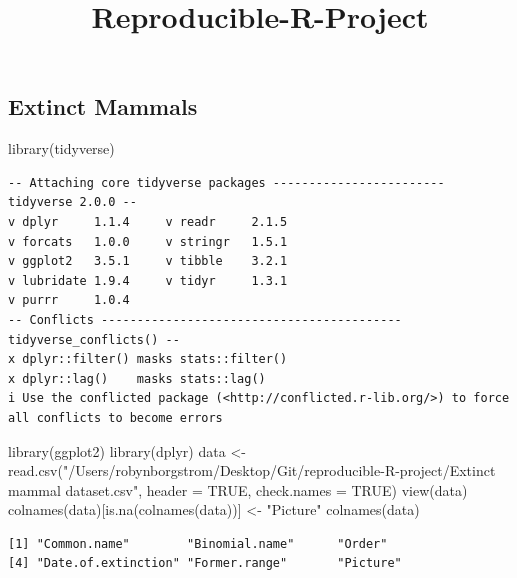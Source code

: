 \documentclass[
  letterpaper,
  DIV=11,
  numbers=noendperiod]{scrartcl}
\title{Reproducible-R-Project}
\author{}
\date{}
\newenvironment{Shaded}{\begin{snugshade}}{\end{snugshade}}
\newcommand{\AttributeTok}[1]{\textcolor[rgb]{0.40,0.45,0.13}{#1}}
\newcommand{\ConstantTok}[1]{\textcolor[rgb]{0.56,0.35,0.01}{#1}}
\newcommand{\FunctionTok}[1]{\textcolor[rgb]{0.28,0.35,0.67}{#1}}
\newcommand{\NormalTok}[1]{\textcolor[rgb]{0.00,0.23,0.31}{#1}}
\newcommand{\OtherTok}[1]{\textcolor[rgb]{0.00,0.23,0.31}{#1}}
\newcommand{\StringTok}[1]{\textcolor[rgb]{0.13,0.47,0.30}{#1}}
\begin{document}
\maketitle


\subsection{Extinct Mammals}\label{extinct-mammals}

\begin{Shaded}
\begin{Highlighting}[]
\FunctionTok{library}\NormalTok{(tidyverse)}
\end{Highlighting}
\end{Shaded}

\begin{verbatim}
-- Attaching core tidyverse packages ------------------------ tidyverse 2.0.0 --
v dplyr     1.1.4     v readr     2.1.5
v forcats   1.0.0     v stringr   1.5.1
v ggplot2   3.5.1     v tibble    3.2.1
v lubridate 1.9.4     v tidyr     1.3.1
v purrr     1.0.4     
-- Conflicts ------------------------------------------ tidyverse_conflicts() --
x dplyr::filter() masks stats::filter()
x dplyr::lag()    masks stats::lag()
i Use the conflicted package (<http://conflicted.r-lib.org/>) to force all conflicts to become errors
\end{verbatim}

\begin{Shaded}
\begin{Highlighting}[]
\FunctionTok{library}\NormalTok{(ggplot2)}
\FunctionTok{library}\NormalTok{(dplyr)}
\NormalTok{data }\OtherTok{\textless{}{-}} \FunctionTok{read.csv}\NormalTok{(}\StringTok{"/Users/robynborgstrom/Desktop/Git/reproducible{-}R{-}project/Extinct mammal dataset.csv"}\NormalTok{, }\AttributeTok{header =} \ConstantTok{TRUE}\NormalTok{, }\AttributeTok{check.names =} \ConstantTok{TRUE}\NormalTok{)}
\FunctionTok{view}\NormalTok{(data)}
\FunctionTok{colnames}\NormalTok{(data)[}\FunctionTok{is.na}\NormalTok{(}\FunctionTok{colnames}\NormalTok{(data))] }\OtherTok{\textless{}{-}} \StringTok{"Picture"}
\FunctionTok{colnames}\NormalTok{(data)}
\end{Highlighting}
\end{Shaded}

\begin{verbatim}
[1] "Common.name"        "Binomial.name"      "Order"             
[4] "Date.of.extinction" "Former.range"       "Picture"           
\end{verbatim}
\end{document}
